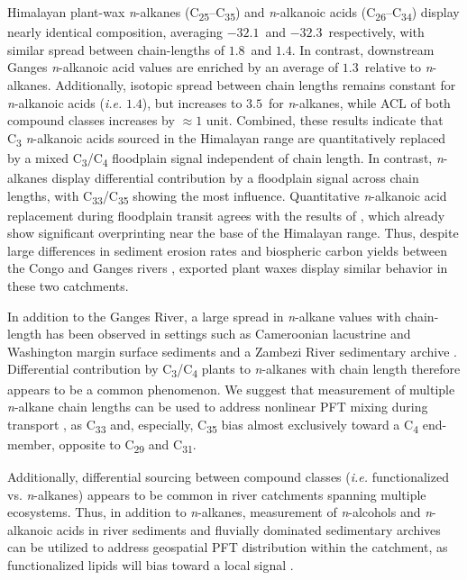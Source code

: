 Himalayan plant-wax \textit{n}-alkanes (C\textsubscript{25}--C\textsubscript{35}) and \textit{n}-alkanoic acids (C\textsubscript{26}--C\textsubscript{34}) display nearly identical  composition, averaging $-32.1$\textperthousand\ and $-32.3$\textperthousand\ respectively, with similar spread between chain-lengths of $1.8$\textperthousand\ and $1.4$\textperthousand. In contrast, downstream Ganges \textit{n}-alkanoic acid  values are enriched by an average of $1.3$\textperthousand\ relative to \textit{n}-alkanes. Additionally, isotopic spread between chain lengths remains constant for \textit{n}-alkanoic acids (\textit{i.e.} $1.4$\textperthousand), but increases to $3.5$\textperthousand\ for \textit{n}-alkanes, while ACL of both compound classes increases by $\approx 1$ unit. Combined, these results indicate that C\textsubscript{3} \textit{n}-alkanoic acids sourced in the Himalayan range are quantitatively replaced by a mixed C\textsubscript{3}/C\textsubscript{4} floodplain signal independent of chain length. In contrast, \textit{n}-alkanes display differential contribution by a floodplain signal across chain lengths, with C\textsubscript{33}/C\textsubscript{35} showing the most influence. Quantitative \textit{n}-alkanoic acid replacement during floodplain transit agrees with the results of \citet{Agrawal:2014fl}, which already show significant overprinting near the base of the Himalayan range. Thus, despite large differences in sediment erosion rates and biospheric carbon yields between the Congo and Ganges rivers \citep{Galy:2015fx}, exported plant waxes display similar behavior in these two catchments.

In addition to the Ganges River, a large spread in \textit{n}-alkane  values with chain-length has been observed in settings such as Cameroonian lacustrine and Washington margin surface sediments \citep{Feng:2013iv,Garcin:2014hg} and a Zambezi River sedimentary archive \citep{Wang:2013jz}. Differential contribution by C\textsubscript{3}/C\textsubscript{4} plants to \textit{n}-alkanes with chain length therefore appears to be a common phenomenon. We suggest that  measurement of multiple \textit{n}-alkane chain lengths can be used to address nonlinear PFT mixing during transport \citep{Garcin:2014hg}, as C\textsubscript{33} and, especially, C\textsubscript{35} bias almost exclusively toward a C\textsubscript{4} end-member, opposite to C\textsubscript{29} and C\textsubscript{31}.

Additionally, differential sourcing between compound classes (\textit{i.e.} functionalized vs. \textit{n}-alkanes) appears to be common in river catchments spanning multiple ecosystems. Thus, in addition to \textit{n}-alkanes, measurement of \textit{n}-alcohols and \textit{n}-alkanoic acids in river sediments and fluvially dominated sedimentary archives can be utilized to address geospatial PFT distribution within the catchment, as functionalized lipids will bias toward a local signal \citep[\textit{e.g.}][this study]{Galy:2011ix,Ponton:2014jr}.

